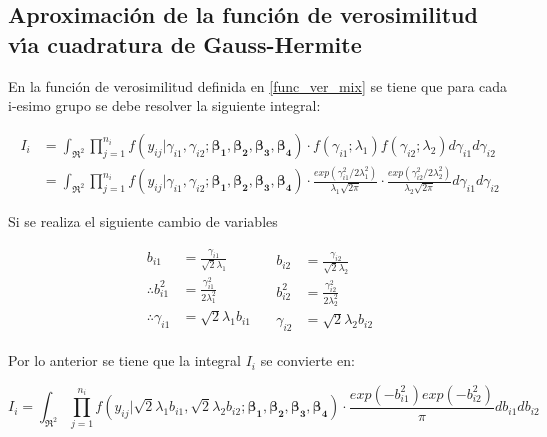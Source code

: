 \subsection{Aproximaci\'{o}n de la funci\'{o}n de verosimilitud v\'{\i}a cuadratura de Gauss-Hermite}

En la funci\'{o}n de verosimilitud definida en \eqref{func_ver_mix} se tiene que para cada i-esimo grupo se debe resolver la siguiente integral:

\begin{align*}
I_i &= \int_{\Re^2}{\prod_{j=1}^{n_i}f(y_{ij}|\gamma_{i1},\gamma_{i2};\boldsymbol{\beta_1}, \boldsymbol{\beta_2}, \boldsymbol{\beta_3}, \boldsymbol{\beta_4})\cdot f(\gamma_{i1};\lambda_1) f(\gamma_{i2};\lambda_2) d\gamma_{i1}d\gamma_{i2}}\\
&=\int_{\Re^2}{\prod_{j=1}^{n_i}f(y_{ij}|\gamma_{i1},\gamma_{i2};\boldsymbol{\beta_1}, \boldsymbol{\beta_2}, \boldsymbol{\beta_3}, \boldsymbol{\beta_4})\cdot \frac{exp({\gamma_{i1}^2}/{2\lambda_1^2})}{\lambda_1\sqrt{2\pi}} \cdot \frac{exp({\gamma_{i2}^2}/{2\lambda_2^2})}{\lambda_2\sqrt{2\pi}} d\gamma_{i1}d\gamma_{i2}}
\end{align*}

Si se realiza el siguiente cambio de variables

\begin{equation*}
\begin{aligned}
b_{i1}&=\frac{\gamma_{i1}}{\sqrt{2}\lambda_1}\\
\therefore b_{i1}^2&=\frac{\gamma_{i1}^2}{2\lambda_1^2}\\
\therefore \gamma_{i1}&=\sqrt{2}\lambda_1b_{i1}\\
\end{aligned}
\quad
\begin{aligned}
b_{i2}&=\frac{\gamma_{i2}}{\sqrt{2}\lambda_2}\\
b_{i2}^2&=\frac{\gamma_{i2}^2}{2\lambda_2^2}\\
\gamma_{i2}&=\sqrt{2}\lambda_2 b_{i2}
\end{aligned}
\end{equation*}

Por lo anterior se tiene que la integral $I_i$ se convierte en:

\begin{equation}
I_i=\int_{\Re^2}{\prod_{j=1}^{n_i}f(y_{ij}|\sqrt{2}\lambda_1b_{i1},\sqrt{2}\lambda_2 b_{i2};\boldsymbol{\beta_1}, \boldsymbol{\beta_2}, \boldsymbol{\beta_3}, \boldsymbol{\beta_4})\cdot \frac{exp(-b_{i1}^2) exp(-b_{i2}^2)}{\pi} db_{i1}db_{i2}}
\label{Int_vero_mix}
\end{equation}

